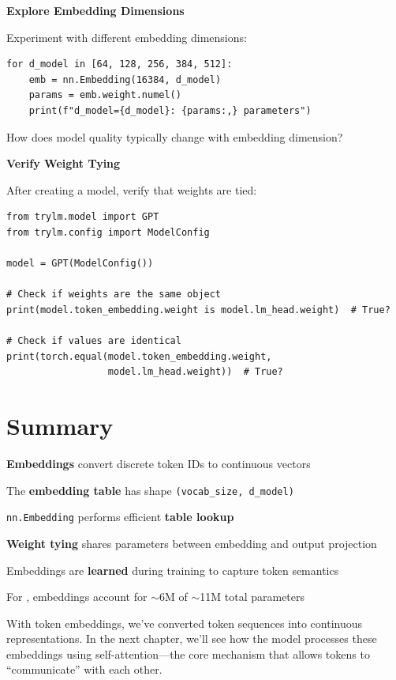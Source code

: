 \begin{exercise}
\textbf{Explore Embedding Dimensions}

Experiment with different embedding dimensions:
\begin{lstlisting}[style=python, numbers=none]
for d_model in [64, 128, 256, 384, 512]:
    emb = nn.Embedding(16384, d_model)
    params = emb.weight.numel()
    print(f"d_model={d_model}: {params:,} parameters")
\end{lstlisting}

How does model quality typically change with embedding dimension?
\end{exercise}

\begin{exercise}
\textbf{Verify Weight Tying}

After creating a model, verify that weights are tied:
\begin{lstlisting}[style=python, numbers=none]
from trylm.model import GPT
from trylm.config import ModelConfig

model = GPT(ModelConfig())

# Check if weights are the same object
print(model.token_embedding.weight is model.lm_head.weight)  # True?

# Check if values are identical
print(torch.equal(model.token_embedding.weight,
                  model.lm_head.weight))  # True?
\end{lstlisting}
\end{exercise}

\section{Summary}

\begin{summary}
    \item \textbf{Embeddings} convert discrete token IDs to continuous vectors
    \item The \textbf{embedding table} has shape \texttt{(vocab\_size, d\_model)}
    \item \texttt{nn.Embedding} performs efficient \textbf{table lookup}
    \item \textbf{Weight tying} shares parameters between embedding and output projection
    \item Embeddings are \textbf{learned} during training to capture token semantics
    \item For \TryLM, embeddings account for $\sim$6M of $\sim$11M total parameters
\end{summary}

With token embeddings, we've converted token sequences into continuous representations. In the next chapter, we'll see how the model processes these embeddings using self-attention---the core mechanism that allows tokens to ``communicate'' with each other.
